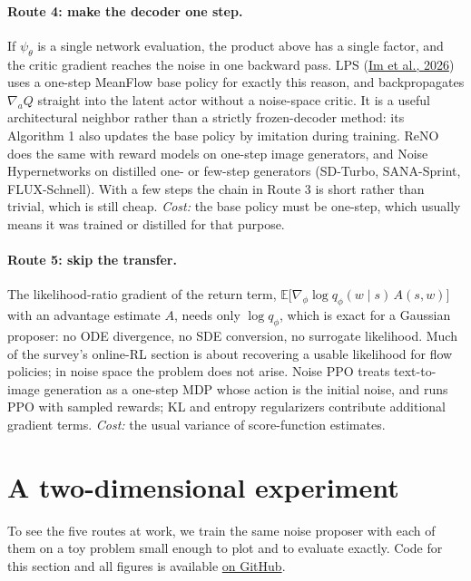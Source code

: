 \paragraph{Route 4: make the decoder one step.} If $\psi_\theta$ is a single network evaluation, the product above has a single factor, and the critic gradient reaches the noise in one backward pass. LPS (\hyperlink{ref:12}{Im et al., 2026}) uses a one-step MeanFlow base policy for exactly this reason, and backpropagates $\nabla_a Q$ straight into the latent actor without a noise-space critic. It is a useful architectural neighbor rather than a strictly frozen-decoder method: its Algorithm 1 also updates the base policy by imitation during training. ReNO does the same with reward models on one-step image generators, and Noise Hypernetworks on distilled one- or few-step generators (SD-Turbo, SANA-Sprint, FLUX-Schnell). With a few steps the chain in Route 3 is short rather than trivial, which is still cheap. \emph{Cost:} the base policy must be one-step, which usually means it was trained or distilled for that purpose.

\paragraph{Route 5: skip the transfer.} The likelihood-ratio gradient of the return term, $\mathbb{E}\big[\nabla_\phi \log q_\phi(w \mid s)\, A(s, w)\big]$ with an advantage estimate $A$, needs only $\log q_\phi$, which is exact for a Gaussian proposer: no ODE divergence, no SDE conversion, no surrogate likelihood. Much of the survey's online-RL section is about recovering a usable likelihood for flow policies; in noise space the problem does not arise. Noise PPO treats text-to-image generation as a one-step MDP whose action is the initial noise, and runs PPO with sampled rewards; KL and entropy regularizers contribute additional gradient terms. \emph{Cost:} the usual variance of score-function estimates.

\section{A two-dimensional experiment}
\label{sec:4}
To see the five routes at work, we train the same noise proposer with each of them on a toy problem small enough to plot and to evaluate exactly. Code for this section and all figures is available \href{https://github.com/yuhanchi/yuhanchi.github.io/tree/main/\_src/choose-the-noise}{on GitHub}.

